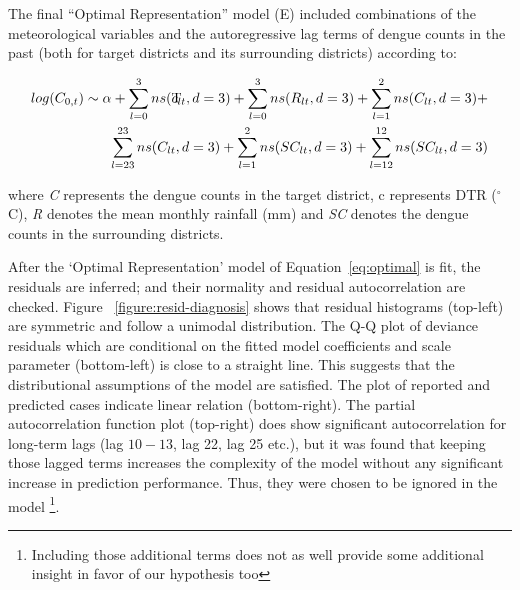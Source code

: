 \documentclass{bmcart}
\begin{document}
The final ``Optimal Representation'' model (E) included combinations of the meteorological variables and the autoregressive lag terms of dengue counts in the past (both for target districts and its surrounding districts) according to:

\begin{equation}
\begin{aligned}
\label{eq:optimal}
log (C_{0,t}) \sim \alpha +  \sum_{l=0}^{3} ns(\rlap{T}c _ {lt}, d =3) + \sum_{l=0}^{3} ns(R_ {lt}, d =3) +\sum_{l=1}^{2} ns(C_ {lt}, d =3)  + \\
\sum_{l=23}^{23} ns(C_ {lt}, d =3) + \sum_{l=1}^{2} ns(SC_ {lt}, d =3) + \sum_{l=12}^{12} ns(SC_ {lt}, d =3)
\end{aligned}
\end{equation}

where \textit{C} represents the dengue counts in the target district, c represents DTR ($^{\circ}$C), \textit{R} denotes the mean monthly rainfall (mm) and \textit{SC} denotes the dengue counts in the surrounding districts. 


After the `Optimal Representation' model of Equation~\ref{eq:optimal} is fit, the residuals are inferred; and their normality and residual autocorrelation are checked. Figure ~\ref{figure:resid-diagnosis} shows that residual histograms (top-left) are symmetric and follow a unimodal distribution. The Q-Q plot of deviance residuals which are conditional on the fitted model coefficients and scale parameter (bottom-left) is close to a straight line. This suggests that the distributional assumptions of the model are satisfied. The plot of reported and predicted cases indicate linear relation (bottom-right). The partial autocorrelation function plot (top-right) does show significant autocorrelation for long-term lags (lag $10-13$, lag 22, lag 25 etc.), but it was found that keeping those lagged terms increases the complexity of the model without any significant increase in prediction performance. Thus, they were chosen to be ignored in the model \footnote{Including those additional terms does not as well provide some additional insight in favor of our hypothesis too}. 
\end{document}
